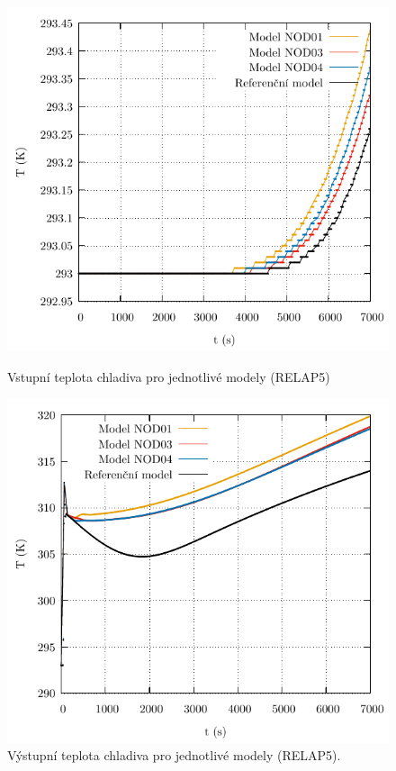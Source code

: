 \begin{figure}[H]
	\centering
	\begin{minipage}{.5\textwidth}
		\centering
		\includegraphics[width=\textwidth]{./06_hodnoceni_TH_modelu/grafy/T_in_stationary_102_long.pdf}
		\caption{Vstupní teplota chladiva pro jednotlivé modely (RELAP5)}
		\label{fig:T_in_stationary_102_long}
	\end{minipage}%
	\begin{minipage}{.5\textwidth}
		\centering
		\includegraphics[width=\linewidth]{./06_hodnoceni_TH_modelu/grafy/T_out_stationary_100_long.pdf}
		\caption{Výstupní teplota chladiva pro jednotlivé modely (RELAP5).}
		\label{fig:T_out_stationary_100_long}
	\end{minipage}
	
\end{figure}

